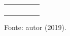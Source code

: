 \begin{table}[H]
\begin{tabular*}{\columnwidth}{@{\extracolsep{\fill}}clcrl}
                                               &                                                                                                            &            &                  &                                                                                                                                                                                                                                                                                                                                                                                                                                                                           \\
                                               &                                                                                                            &            &                  &                                                                                                                                                                                                                                                                                                                                                                                                                                                                           \\
                                               &                                                                                                            &            &                  &                                                                                                                                                                                                                                                                                                                                                                                                                                                                           \\
                                               &                                                                                                            &            &                  &                                                                                                                                                                                                                                                                                                                                                                                                                                                                           \\ \hline
        \end{tabular*}
        \begin{flushleft}
            \par \small Fonte: autor (2019).
        \end{flushleft}
        \end{table}
